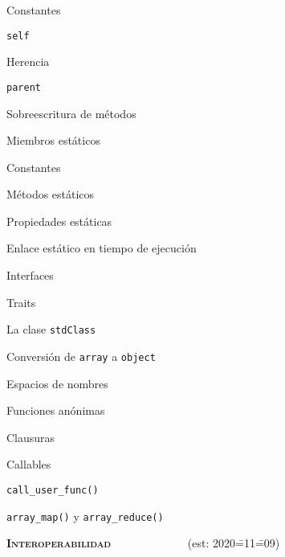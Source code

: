 \begin{longenum}
\begin{longenum}
\begin{longenum}
\begin{longenum}
            \end{longenum}
            \item Constantes
            \begin{longenum}
                \item \texttt{self}
            \end{longenum}
            \item Herencia
            \begin{longenum}
                \item \texttt{parent}
                \item Sobreescritura de métodos
            \end{longenum}
            \item Miembros estáticos
            \begin{longenum}
                \item Constantes
                \item Métodos estáticos
                \item Propiedades estáticas
                \item Enlace estático en tiempo de ejecución
            \end{longenum}
            \item Interfaces
            \item Traits
            \item La clase \texttt{stdClass}
            \begin{longenum}
                \item Conversión de \texttt{array} a \texttt{object}
            \end{longenum}
        \end{longenum}
        \item Espacios de nombres
        \item Funciones anónimas
        \begin{longenum}
            \item Clausuras
        \end{longenum}
        \item Callables
        \begin{longenum}
            \item \texttt{call\_user\_func()}
            \item \texttt{array\_map()} y \texttt{array\_reduce()}
        \end{longenum}
    \end{longenum}
    \item \textbf{\textsc{Interoperabilidad}} \ \ \ \ \ \ \ \ \ \ \ \ \ (est: 2020\==11\==09)

\end{longenum}
